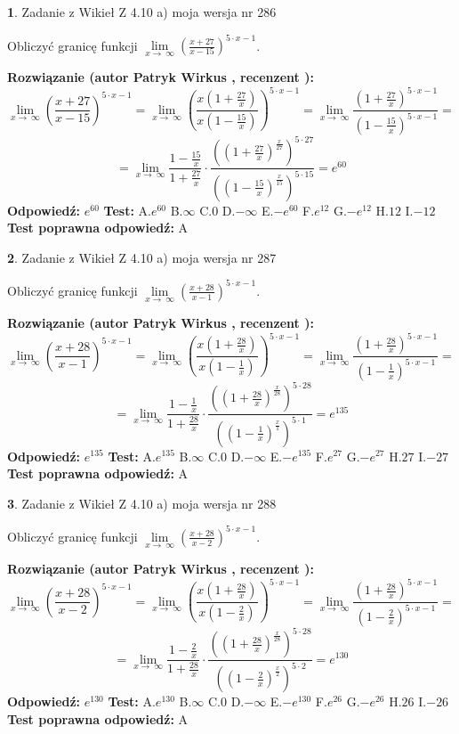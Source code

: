 \documentclass[12pt, a4paper]{article}
\theoremstyle{definition} %
\newtheorem{zad}{}
\newcommand{\zadStart}[1]{\begin{zad}#1\newline}
\newcommand{\zadStop}{\end{zad}}
\newcommand{\rozwStart}[2]{\noindent \textbf{Rozwiązanie (autor #1 , recenzent #2): }\newline}
\newcommand{\rozwStop}{\newline}
\newcommand{\odpStart}{\noindent \textbf{Odpowiedź:}\newline}
\newcommand{\odpStop}{\newline}
\newcommand{\testStart}{\noindent \textbf{Test:}\newline}
\newcommand{\testStop}{\newline}
\newcommand{\kluczStart}{\noindent \textbf{Test poprawna odpowiedź:}\newline}
\newcommand{\kluczStop}{\newline}
\begin{document}
\zadStart{Zadanie z Wikieł Z 4.10 a) moja wersja nr 286}

Obliczyć granicę funkcji  $\lim\limits_{x\to\ \infty}(\frac{x+27}{x-15})^{5\cdot x-1}$.
\zadStop
\rozwStart{Patryk Wirkus}{}
$$\lim\limits_{x\to\ \infty}(\frac{x+27}{x-15})^{5\cdot x-1} = \lim\limits_{x\to\ \infty}(\frac{x(1+\frac{27}{x})}{x(1-\frac{15}{x})})^{5\cdot x-1}=\lim\limits_{x\to\ \infty}\frac{(1+\frac{27}{x})^{5\cdot x-1}}{(1-\frac{15}{x})^{5\cdot x-1}}=$$
$$=\lim\limits_{x\to\ \infty}\frac{1-\frac{15}{x}}{1+\frac{27}{x}}\cdot\frac{((1+\frac{27}{x})^{\frac{x}{27}})^{5\cdot27}}{((1-\frac{15}{x})^{\frac{x}{15}})^{5\cdot15}}=e^{60}$$
\rozwStop
\odpStart
$e^{60}$
\odpStop
\testStart
A.$e^{60}$ B.$\infty$ C.$0$ D.$-\infty$ E.$-e^{60}$
F.$e^{12}$ G.$-e^{12}$
H.$12$
I.$-12$
\testStop
\kluczStart
A
\kluczStop



\zadStart{Zadanie z Wikieł Z 4.10 a) moja wersja nr 287}

Obliczyć granicę funkcji  $\lim\limits_{x\to\ \infty}(\frac{x+28}{x-1})^{5\cdot x-1}$.
\zadStop
\rozwStart{Patryk Wirkus}{}
$$\lim\limits_{x\to\ \infty}(\frac{x+28}{x-1})^{5\cdot x-1} = \lim\limits_{x\to\ \infty}(\frac{x(1+\frac{28}{x})}{x(1-\frac{1}{x})})^{5\cdot x-1}=\lim\limits_{x\to\ \infty}\frac{(1+\frac{28}{x})^{5\cdot x-1}}{(1-\frac{1}{x})^{5\cdot x-1}}=$$
$$=\lim\limits_{x\to\ \infty}\frac{1-\frac{1}{x}}{1+\frac{28}{x}}\cdot\frac{((1+\frac{28}{x})^{\frac{x}{28}})^{5\cdot28}}{((1-\frac{1}{x})^{\frac{x}{1}})^{5\cdot1}}=e^{135}$$
\rozwStop
\odpStart
$e^{135}$
\odpStop
\testStart
A.$e^{135}$ B.$\infty$ C.$0$ D.$-\infty$ E.$-e^{135}$
F.$e^{27}$ G.$-e^{27}$
H.$27$
I.$-27$
\testStop
\kluczStart
A
\kluczStop



\zadStart{Zadanie z Wikieł Z 4.10 a) moja wersja nr 288}

Obliczyć granicę funkcji  $\lim\limits_{x\to\ \infty}(\frac{x+28}{x-2})^{5\cdot x-1}$.
\zadStop
\rozwStart{Patryk Wirkus}{}
$$\lim\limits_{x\to\ \infty}(\frac{x+28}{x-2})^{5\cdot x-1} = \lim\limits_{x\to\ \infty}(\frac{x(1+\frac{28}{x})}{x(1-\frac{2}{x})})^{5\cdot x-1}=\lim\limits_{x\to\ \infty}\frac{(1+\frac{28}{x})^{5\cdot x-1}}{(1-\frac{2}{x})^{5\cdot x-1}}=$$
$$=\lim\limits_{x\to\ \infty}\frac{1-\frac{2}{x}}{1+\frac{28}{x}}\cdot\frac{((1+\frac{28}{x})^{\frac{x}{28}})^{5\cdot28}}{((1-\frac{2}{x})^{\frac{x}{2}})^{5\cdot2}}=e^{130}$$
\rozwStop
\odpStart
$e^{130}$
\odpStop
\testStart
A.$e^{130}$ B.$\infty$ C.$0$ D.$-\infty$ E.$-e^{130}$
F.$e^{26}$ G.$-e^{26}$
H.$26$
I.$-26$
\testStop
\kluczStart
A
\kluczStop
\end{document}
